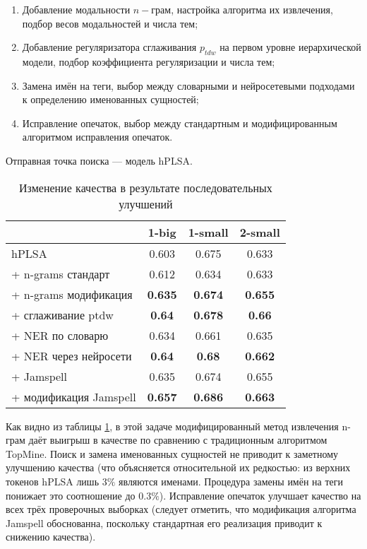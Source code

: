 \begin{enumerate}
    \item Добавление модальности $n-$грам, настройка алгоритма их извлечения, подбор весов модальностей и числа тем;
    \item Добавление регуляризатора сглаживания $p_{tdw}$ на первом уровне иерархической модели, подбор коэффициента регуляризации и числа тем; 
    \item Замена имён на теги, выбор между словарными и нейросетевыми подходами к определению именованных сущностей; 
    \item Исправление опечаток, выбор между стандартным и модифицированным алгоритмом исправления опечаток.  
\end{enumerate}

Отправная точка поиска --- модель hPLSA.

\begin{table}[!h] 
    \centering 
\begin{tabular}{p{2.7cm}|c|c|c} 
    \hline 
    & 1-big            & 1-small            & 2-small            \\ \hline 
    hPLSA         & 0.603          & 0.675          & 0.633          \\ 
\hline \hline 
    + n-grams стандарт & 0.612 & 0.634 & 0.633 \\ 
    + n-grams модификация & \textbf{0.635} & \textbf{0.674} & \textbf{0.655} \\ 
\hline \hline 
    + сглаживание ptdw & \textbf{0.64} & \textbf{0.678} & \textbf{0.66} \\ 
\hline \hline 
    + NER по словарю & 0.634         & 0.661         & 0.635 \\ 
    + NER через нейросети & \textbf{0.64} & \textbf{0.68} & \textbf{0.662} \\ 
\hline \hline 
    + Jamspell  & {0.635} & {0.674} &  {0.655} \\ 
    + модификация Jamspell & \textbf{0.657} & \textbf{0.686} & \textbf{0.663} \\  \hline 
\end{tabular} 
    \caption{Изменение качества в результате последовательных улучшений} 
    \label{nlp_techniques} 
\end{table}

Как видно из таблицы \ref{nlp_techniques}, в этой задаче модифицированный метод извлечения n-грам даёт выигрыш в качестве по сравнению с традиционным алгоритмом TopMine. Поиск и замена именованных сущностей не приводит к заметному улучшению качества (что объясняется относительной их редкостью: из верхних токенов hPLSA лишь $3\%$ являются именами. Процедура замены имён на теги понижает это соотношение до $0.3\%$). Исправление опечаток улучшает качество на всех трёх проверочных выборках (следует отметить, что модификация алгоритма Jamspell обоснованна, поскольку стандартная его реализация приводит к снижению качества).

